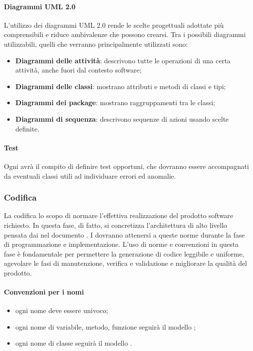 \paragraph{Diagrammi UML 2.0}
L'utilizzo dei diagrammi UML 2.0 rende le scelte progettuali adottate più comprensibili e riduce ambivalenze che possono crearsi. Tra i possibili diagrammi utilizzabili, quelli che verranno principalmente utilizzati sono:
\begin{itemize}
\item \textbf{Diagrammi delle attività}: descrivono tutte le operazioni di una certa attività, anche fuori dal contesto software;
\item \textbf{Diagrammi delle classi}: mostrano attributi e metodi di classi e tipi;
\item \textbf{Diagrammi dei package}: mostrano raggruppamenti tra le classi;
\item \textbf{Diagrammi di sequenza}: descrivono sequenze di azioni usando scelte definite.
\end{itemize}
\paragraph{Test}
Ogni \prog{} avrà il compito di definire test opportuni, che dovranno essere accompagnati da eventuali classi utili ad individuare errori ed anomalie.
\subsubsection{Codifica}
La codifica lo scopo di normare l'effettiva realizzazione del prodotto software richiesto. In questa fase, di fatto, si concretizza l'architettura di alto livello pensata dai \progs{} nel documento \PdQ{}. I \progrs{} dovranno attenersi a queste norme durante la fase di programmazione e implementazione. L'uso di norme e convenzioni in questa fase è fondamentale per permettere la generazione di codice leggibile e uniforme, agevolare le fasi di manutenzione, verifica e validazione e migliorare la qualità del prodotto.
\paragraph{Convenzioni per i nomi}
\begin{itemize}
	\item ogni nome deve essere univoco;
	\item ogni nome di variabile, metodo, funzione seguirà il modello ;
	\item ogni nome di classe seguirà il modello .
\end{itemize}
\newpage
